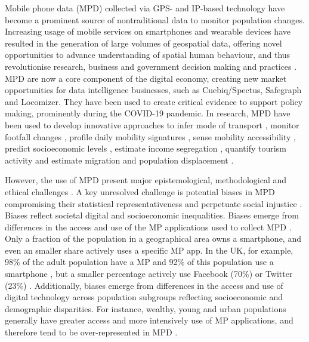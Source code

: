 \documentclass[]{rsos}%
\begin{document}
Mobile phone data (MPD) collected via GPS- and IP-based technology have
become a prominent source of nontraditional data to monitor population
changes. Increasing usage of mobile services on smartphones and wearable
devices have resulted in the generation of large volumes of geospatial
data, offering novel opportunities to advance understanding of spatial
human behaviour, and thus revolutionise research, business and
government decision making and practices \citep{rowe23-bigdata}. MPD are now
a core component of the digital economy, creating new market
opportunities for data intelligence businesses, such as Cuebiq/Spectus,
Safegraph and Locomizer. They have been used to create critical evidence
to support policy making, prominently during the COVID-19 pandemic. In
research, MPD have been used to develop innovative approaches to infer
mode of transport \citep{graells-garrido2023}, monitor footfall changes
\citep{ballantyne2022, hunter2021}, profile daily mobility signatures
\citep{cabrera-arnau2023}, sense mobility accessibility
\citep{graells-garrido2021}, predict socioeconomic levels \citep{soto2011, blumenstock2015}, estimate income segregation \citep{moro2021}, quantify
tourism activity \citep{raun2016} and estimate migration \citep{cepal24, gonzález-leonardo2025} and population displacement \citep{rowe2022, iradukunda2025}.

However, the use of MPD present major epistemological, methodological
and ethical challenges \citep{rowe23-bigdata}. A key unresolved challenge is
potential biases in MPD compromising their statistical
representativeness and perpetuate social injustice
\citep{wesolowski13-biases}. Biases reflect societal digital and
socioeconomic inequalities. Biases emerge from differences in the access
and use of the MP applications used to collect MPD
\citep{porter2012, wesolowski13-biases}. Only a fraction of the population
in a geographical area owns a smartphone, and even an smaller share
actively uses a specific MP app. In the UK, for example, 98\%
of the adult population have a MP and 92\% of this population
use a smartphone \citep{ofcom23}, but a smaller percentage actively use
Facebook (70\%) or Twitter (23\%) \citep{statista24}. Additionally, biases
emerge from differences in the access and use of digital technology
across population subgroups reflecting socioeconomic and demographic
disparities. For instance, wealthy, young and urban populations
generally have greater access and more intensively use of MP
applications, and therefore tend to be over-represented in MPD
\citep{blumenstock2010, wesolowski13-biases, schlosser21-biases}.
\end{document}
